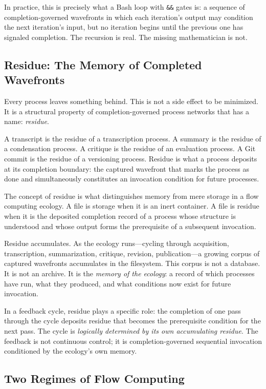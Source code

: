 \documentclass[12pt, a4paper]{article}
\begin{document}
In practice, this is precisely what a Bash loop with
\texttt{\&\&} gates is: a sequence of completion-governed wavefronts
in which each iteration's output may condition the next iteration's
input, but no iteration begins until the previous one has signaled
completion. The recursion is real. The missing mathematician is not.

\subsection{Residue: The Memory of Completed Wavefronts}

Every process leaves something behind. This is not a side effect
to be minimized. It is a structural property of completion-governed
process networks that has a name: \emph{residue}.

A transcript is the residue of a transcription process. A summary
is the residue of a condensation process. A critique is the residue
of an evaluation process. A Git commit is the residue of a
versioning process. Residue is what a process deposits at its
completion boundary: the captured wavefront that marks the process
as done and simultaneously constitutes an invocation condition
for future processes.

The concept of residue is what distinguishes memory from mere
storage in a flow computing ecology. A file is storage when it is
an inert container. A file is residue when it is the deposited
completion record of a process whose structure is understood and
whose output forms the prerequisite of a subsequent invocation.

Residue accumulates. As the ecology runs---cycling through
acquisition, transcription, summarization, critique, revision,
publication---a growing corpus of captured wavefronts accumulates
in the filesystem. This corpus is not a database. It is not an
archive. It is the \emph{memory of the ecology}: a record of which
processes have run, what they produced, and what conditions now
exist for future invocation.

In a feedback cycle, residue plays a specific role: the completion
of one pass through the cycle deposits residue that becomes the
prerequisite condition for the next pass. The cycle is
\emph{logically determined by its own accumulating residue}.
The feedback is not continuous control; it is completion-governed
sequential invocation conditioned by the ecology's own memory.

\subsection{Two Regimes of Flow Computing}
\end{document}
